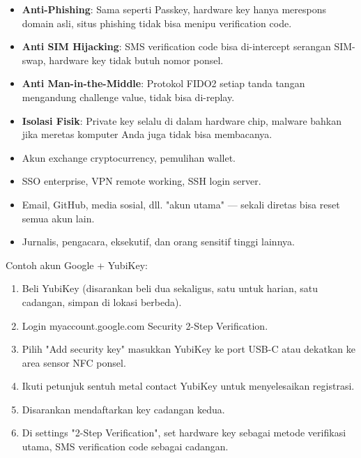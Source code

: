 
\begin{itemize}
  \item \textbf{Anti-Phishing}: Sama seperti Passkey, hardware key hanya merespons domain asli, situs phishing tidak bisa menipu verification code.
  \item \textbf{Anti SIM Hijacking}: SMS verification code bisa di-intercept serangan SIM-swap, hardware key tidak butuh nomor ponsel.
  \item \textbf{Anti Man-in-the-Middle}: Protokol FIDO2 setiap tanda tangan mengandung challenge value, tidak bisa di-replay.
  \item \textbf{Isolasi Fisik}: Private key selalu di dalam hardware chip, malware bahkan jika meretas komputer Anda juga tidak bisa membacanya.
\end{itemize}


\begin{itemize}
  \item Akun exchange cryptocurrency, pemulihan wallet.
  \item SSO enterprise, VPN remote working, SSH login server.
  \item Email, GitHub, media sosial, dll. "akun utama" — sekali diretas bisa reset semua akun lain.
  \item Jurnalis, pengacara, eksekutif, dan orang sensitif tinggi lainnya.
\end{itemize}


Contoh akun Google + YubiKey:

\begin{enumerate}
  \item Beli YubiKey (disarankan beli dua sekaligus, satu untuk harian, satu cadangan, simpan di lokasi berbeda).
  \item Login myaccount.google.com Security 2-Step Verification.
  \item Pilih "Add security key" masukkan YubiKey ke port USB-C atau dekatkan ke area sensor NFC ponsel.
  \item Ikuti petunjuk sentuh metal contact YubiKey untuk menyelesaikan registrasi.
  \item Disarankan mendaftarkan key cadangan kedua.
  \item Di settings "2-Step Verification", set hardware key sebagai metode verifikasi utama, SMS verification code sebagai cadangan.
\end{enumerate}

